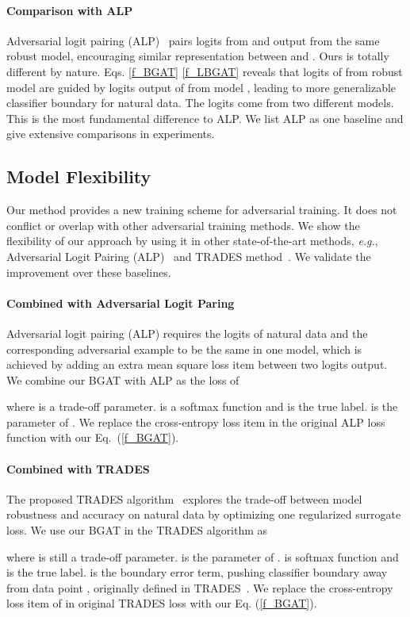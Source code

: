 \documentclass[final]{cvpr}
\begin{document}
\vspace{-0.1in}
\paragraph{Comparison with ALP} Adversarial logit pairing (ALP)~\cite{DBLP:journals/corr/abs-1803-06373} pairs logits from  and  output from the same robust model, encouraging similar representation between  and . Ours is totally different by nature. Eqs. \eqref{f_BGAT} \eqref{f_LBGAT} reveals that logits of  from robust model  are guided by logits output of  from model , leading to more generalizable classifier boundary for natural data. The logits come from two different models. This is the most fundamental difference to ALP. We list ALP as one baseline and give extensive comparisons in experiments.

\subsection{Model Flexibility}
Our method provides a new training scheme for adversarial training. It does not conflict or overlap with other adversarial training methods. We show the flexibility of our approach by using it in other state-of-the-art methods, {\it e.g.}, Adversarial Logit Pairing (ALP)~\cite{DBLP:journals/corr/abs-1803-06373} and TRADES method~\cite{zhang2019theoretically}. We validate the improvement over these baselines.

\paragraph{Combined with Adversarial Logit Paring}
Adversarial logit pairing (ALP) requires the logits of natural data  and the corresponding adversarial example  to be the same in one model, which is achieved by adding an extra mean square loss item between two logits output. We combine our BGAT with ALP as the loss of
\begin{small}
	
\end{small}
where  is a trade-off parameter.  is a softmax function and  is the true label.  is the parameter of . We replace the cross-entropy loss item  in the original ALP loss function with our Eq.~(\ref{f_BGAT}).

\paragraph{Combined with TRADES}
The proposed TRADES algorithm~\cite{zhang2019theoretically} explores the trade-off between model robustness and accuracy on natural data by optimizing one regularized surrogate loss. We use our BGAT in the TRADES algorithm as
\begin{small}
	
\end{small}
where  is still a trade-off parameter.   is the parameter of .  is softmax function and  is the true label.  is the boundary error term, pushing classifier boundary away from data point , originally defined in TRADES~\cite{zhang2019theoretically}. We replace the cross-entropy loss item of   in original TRADES loss with our Eq. (\ref{f_BGAT}). 
\end{document}
